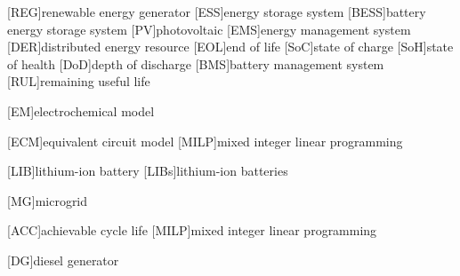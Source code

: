 \begin{acronym}
    [REG]{renewable energy generator}
    [ESS]{energy storage system}
    [BESS]{battery energy storage system}
    [PV]{photovoltaic}
    [EMS]{energy management system}
    [DER]{distributed energy resource}
    [EOL]{end of life}
    [SoC]{state of charge}
    [SoH]{state of health}
    [DoD]{depth of discharge}
    [BMS]{battery management system}
    [RUL]{remaining useful life}
    
    [EM]{electrochemical model}
    
    [ECM]{equivalent circuit model}
    [MILP]{mixed integer linear programming}

    [LIB]{lithium-ion battery}
    [LIBs]{lithium-ion batteries}

    [MG]{microgrid}
    
    [ACC]{achievable cycle life}
    [MILP]{mixed integer linear programming}
    
    [DG]{diesel generator}
\end{acronym}